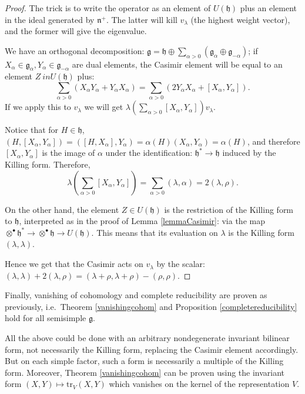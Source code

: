 \begin{proof}
 The trick is to write the operator as an element of $U(\mathfrak h)$ plus an element in the ideal generated by $\mathfrak n^+$. The latter will kill $v_\lambda$ (the highest weight vector), and the former will give the eigenvalue. 

 We have an orthogonal decomposition: $\mathfrak g = \mathfrak h \oplus \sum_{\alpha>0} (\mathfrak g_\alpha\oplus \mathfrak g_{-\alpha})$; if $X_\alpha \in \mathfrak g_\alpha, Y_\alpha\in \mathfrak g_{-\alpha}$ are dual elements, the Casimir element will be equal to an element $Z\ in U(\mathfrak h)$ plus:
$$\sum_{\alpha>0} (X_\alpha Y_\alpha+Y_\alpha X_\alpha) =  \sum_{\alpha>0}\left( 2 Y_\alpha X_\alpha + [X_\alpha, Y_\alpha]\right).$$
If we apply this to $v_\lambda$ we will get $\lambda\left(\sum_{\alpha>0} [X_\alpha, Y_\alpha]\right)v_\lambda$.

Notice that for $H\in \mathfrak h$, $(H, [X_\alpha,Y_\alpha]) = ([H,X_\alpha], Y_\alpha) = \alpha(H) (X_\alpha,Y_\alpha) = \alpha(H)$, and therefore $[X_\alpha,Y_\alpha]$ is the image of $\alpha$ under the identification: $\mathfrak h^*\to\mathfrak h$ induced by the Killing form. Therefore, 
$$ \lambda\left(\sum_{\alpha>0} [X_\alpha, Y_\alpha]\right) = \sum_{\alpha>0} (\lambda, \alpha) = 2(\lambda,\rho).$$
 

 On the other hand, the element $Z\in U(\mathfrak h)$ is the restriction of the Killing form to $\mathfrak h$, interpreted as in the proof of Lemma \ref{lemmaCasimir}: via the map $\otimes^\bullet \mathfrak h^* \to \otimes^\bullet \mathfrak h\to U(\mathfrak h)$. This means that its evaluation on $\lambda$ is the Killing form $(\lambda,\lambda)$. 

 Hence we get that the Casimir acts on $v_\lambda$ by the scalar: $ (\lambda,\lambda)+2 (\lambda,\rho) = (\lambda+\rho,\lambda+\rho)-(\rho,\rho).$
\end{proof}

Finally, vanishing of cohomology and complete reducibility are proven as previously, i.e.\ Theorem \ref{vanishingcohom} and Proposition \ref{completereducibility} hold for all semisimple $\mathfrak g$.


\begin{remark}
 All the above could be done with an arbitrary nondegenerate invariant bilinear form, not necessarily the Killing form, replacing the Casimir element accordingly. But on each simple factor, such a form is necessarily a multiple of the Killing form. Moreover, Theorem \ref{vanishingcohom} can be proven using the invariant form $(X,Y)\mapsto \text{tr}_V(X,Y)$ which vanishes on the kernel of the representation $V$.
\end{remark}



